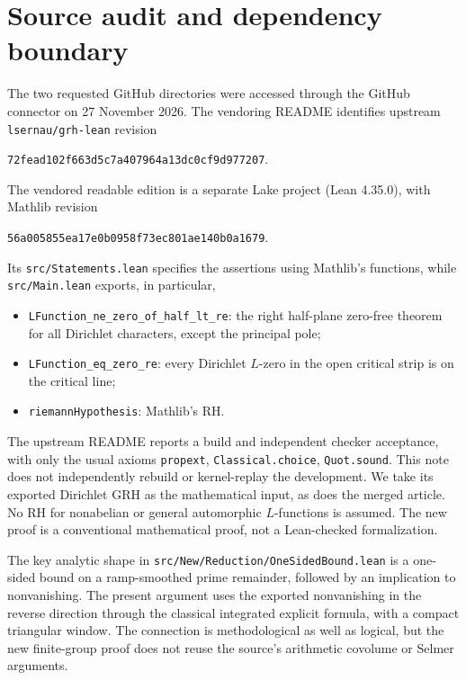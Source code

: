 \documentclass[11pt]{article}
\theoremstyle{definition}\newtheorem{remark}[theorem]{Remark}
\begin{document}
\section{Source audit and dependency boundary}\label{sec:source}
The two requested GitHub directories were accessed through the GitHub connector on 27 November 2026. The vendoring README \cite{Vendored} identifies upstream \texttt{lsernau/grh-lean} revision
\begin{center}\small\texttt{72fead102f663d5c7a407964a13dc0cf9d977207}.\end{center}
The vendored readable edition is a separate Lake project (Lean 4.35.0), with Mathlib revision
\begin{center}\small\texttt{56a005855ea17e0b0958f73ec801ae140b0a1679}.\end{center}
Its \texttt{src/Statements.lean} specifies the assertions using Mathlib's functions, while \texttt{src/Main.lean} exports, in particular,
\begin{itemize}
\item \texttt{LFunction\_ne\_zero\_of\_half\_lt\_re}: the right half-plane zero-free theorem for all Dirichlet characters, except the principal pole;
\item \texttt{LFunction\_eq\_zero\_re}: every Dirichlet $L$-zero in the open critical strip is on the critical line;
\item \texttt{riemannHypothesis}: Mathlib's RH.
\end{itemize}
The upstream README reports a build and independent checker acceptance, with only the usual axioms \texttt{propext}, \texttt{Classical.choice}, \texttt{Quot.sound}. This note does not independently rebuild or kernel-replay the development. We take its exported Dirichlet GRH as the mathematical input, as does the merged article. No RH for nonabelian or general automorphic $L$-functions is assumed. The new proof is a conventional mathematical proof, not a Lean-checked formalization.

The key analytic shape in \texttt{src/New/Reduction/OneSidedBound.lean} is a one-sided bound on a ramp-smoothed prime remainder, followed by an implication to nonvanishing. The present argument uses the exported nonvanishing in the reverse direction through the classical integrated explicit formula, with a compact triangular window. The connection is methodological as well as logical, but the new finite-group proof does not reuse the source's arithmetic covolume or Selmer arguments.
\end{document}

